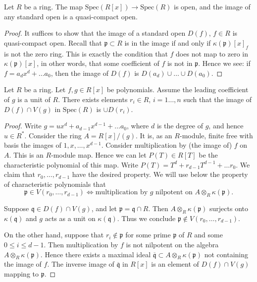 \begin{lemma}
\label{lemma-affineline-open}
Let $R$ be a ring. The map $\text{Spec}(R[x]) \to \text{Spec}(R)$
is open, and the image of any standard open is a quasi-compact
open.
\end{lemma}

\begin{proof}
It suffices to show that the image of a standard open
$D(f)$, $f\in R$ is quasi-compact open.
Recall that $\mathfrak p\subset R$ is in the image
if and only if $\kappa(\mathfrak p)[x]_f$ is not the
zero ring. This is exactly the condition that $f$ does not map
to zero in $\kappa(\mathfrak p)[x]$, in other words, that
some coefficient of $f$ is not in $\mathfrak p$.
Hence we see: if $f = a_d x^d + \ldots a_0$, then
the image of $D(f)$ is $D(a_d) \cup \ldots \cup D(a_0)$.
\end{proof}

\begin{lemma}
\label{lemma-affineline-special}
Let $R$ be a ring. Let $f, g \in R[x]$ be polynomials.
Assume the leading coefficient of $g$ is a unit of $R$.
There exists elements $r_i\in R$, $i=1\ldots,n$ such that
the image of $D(f) \cap V(g)$ in $\text{Spec}(R)$ is
$\cup D(r_i)$.
\end{lemma}

\begin{proof}
Write $g = ux^d + a_{d-1}x^{d-1} + \ldots a_0$, where
$d$ is the degree of $g$, and hence $u \in R^*$.
Consider the ring $A = R[x]/(g)$.
It is, as an $R$-module, finite free with basis the images
of $1,x,\ldots,x^{d-1}$. Consider multiplication
by (the image of) $f$ on $A$. This is an $R$-module map.
Hence we can let $P(T) \in R[T]$ be the characteristic polynomial
of this map. Write $P(T) = T^d + r_{d-1} T^{d-1} + \ldots r_0$.
We claim that $r_0, \ldots, r_{d-1}$ have the desired property.
We will use below the property of characteristic polynomials 
that
$$
\mathfrak p \in V(r_0, \ldots, r_{d-1})
\Leftrightarrow
\text{multiplication by }g\text{ nilpotent on }
A\otimes_R \kappa(\mathfrak p).
$$

\medskip\noindent
Suppose $\mathfrak q\in D(f) \cap V(g)$, and let
$\mathfrak p = \mathfrak q \cap R$. Then
$A\otimes_R \kappa(\mathfrak p)$ surjects onto $\kappa(\mathfrak q)$
and $g$ acts as a unit on $\kappa(\mathfrak q)$. 
Thus we conclude $\mathfrak p \not \in  V(r_0, \ldots, r_{d-1})$.

\medskip\noindent
On the other hand, suppose that $r_i \not\in \mathfrak p$ for some
prime $\mathfrak p$ of $R$ and some $0 \leq i \leq d-1$.
Then multiplication by $f$ is not nilpotent on the algebra
$A \otimes_R \kappa(\mathfrak p)$.
Hence there exists a maximal ideal $\overline{\mathfrak q} \subset
A \otimes_R \kappa(\mathfrak p)$ not containing the image of $f$.
The inverse image of $\overline{\mathfrak q}$ in $R[x]$ 
is an element of $D(f) \cap V(g)$ mapping to $\mathfrak p$.
\end{proof}

